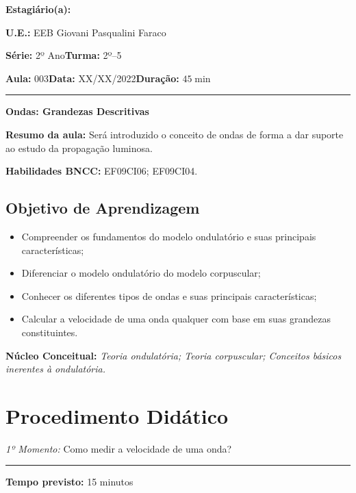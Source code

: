     \noindent \textbf{Estagiário(a): }\imprimirautor 
    
    \noindent \textbf{U.E.: }EEB Giovani Pasqualini Faraco
    
    \noindent \textbf{Série: }2º Ano\hfill{}\textbf{Turma: }2º--5
    
    \noindent \textbf{Aula:} 003\hfill{}\textbf{Data:} XX/XX/2022\hfill{}\textbf{Duração:} $45\min$
    \rule{\textwidth}{.5pt}
    \bigskip{}  
    

    \noindent
    \begin{center}
      \textbf{Ondas: Grandezas Descritivas}
    \par\end{center}

    \noindent \textbf{Resumo da aula:} Será introduzido o conceito de ondas de forma a dar suporte ao estudo da propagação luminosa.

    \par\noindent \textbf{Habilidades BNCC: }EF09CI06; EF09CI04.
    \vspace*{20pt}
    
    \subsection*{Objetivo de Aprendizagem}
    \begin{itemize}
        \item Compreender os fundamentos do modelo ondulatório e suas principais características;
        \item Diferenciar o modelo ondulatório do modelo corpuscular;
        \item Conhecer os diferentes tipos de ondas e suas principais características;
        \item Calcular a velocidade de uma onda qualquer com base em suas grandezas constituintes.
    \end{itemize}
    \medskip{}
    \noindent \textbf{Núcleo Conceitual:} \emph{Teoria ondulatória; Teoria corpuscular; Conceitos básicos inerentes à ondulatória.}

    \section*{Procedimento Didático} 
    \noindent \emph{1º Momento:} Como medir a velocidade de uma onda?
	\par\noindent\rule{.3\textwidth}{.5pt}  
    \par\noindent \textbf{Tempo previsto:} 15 minutos  

